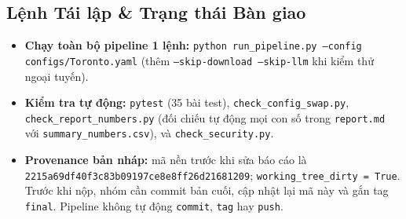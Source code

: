 \documentclass[11pt,a4paper]{article}
\begin{document}
\subsection{Lệnh Tái lập \& Trạng thái Bàn giao}
\begin{samepage}
\begin{storybox}
\begin{itemize}
  \item \textbf{Chạy toàn bộ pipeline 1 lệnh:} \texttt{python run\_pipeline.py --config configs/Toronto.yaml} (thêm \texttt{--skip-download --skip-llm} khi kiểm thử ngoại tuyến).
  \item \textbf{Kiểm tra tự động:} \texttt{pytest} (35 bài test), \texttt{check\_config\_swap.py}, \texttt{check\_report\_numbers.py} (đối chiếu tự động mọi con số trong \texttt{report.md} với \texttt{summary\_numbers.csv}), và \texttt{check\_security.py}.
  \item \textbf{Provenance bản nháp:} mã nền trước khi sửa báo cáo là \texttt{2215a69df40f3c83b09197ce8e8ff26d21681209}; \texttt{working\_tree\_dirty = True}. Trước khi nộp, nhóm cần commit bản cuối, cập nhật lại mã này và gắn tag \texttt{final}. Pipeline không tự động \texttt{commit}, \texttt{tag} hay \texttt{push}.
\end{itemize}
\end{storybox}
\end{samepage}
\end{document}
